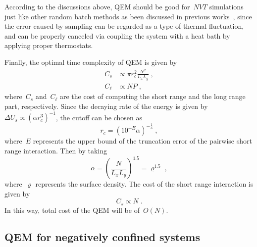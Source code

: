 According to the discussions above, QEM should be good for~$NVT$ simulations just like other random batch methods \cite{jin2020random, jin2021random} as been discussed in previous works~\cite{jin2021convergence,li2019stochastic,li2020random}, since the error caused by sampling can be regarded as a type of thermal fluctuation, and can be properly canceled via coupling the system with a heat bath by applying proper thermostats.

Finally, the optimal time complexity of QEM is given by
\begin{align}
    C_s & \propto \pi r_c^2 \frac{N^2}{L_x L_y}\;,\\
    C_\ell & \propto N P\;,
\end{align}
where~$C_s$ and~$C_\ell$ are the cost of computing the short range and the long range part, respectively.
Since the decaying rate of the energy is given by~$\Delta U_s \propto (\alpha r_c^3)^{-1}$, the cutoff can be chosen as
\begin{equation}
    r_c = (10^{-E} \alpha)^{-\frac{1}{3}}\;,
\end{equation}
where~$E$ represents the upper bound of the truncation error of the pairwise short range interaction.
Then by taking
\begin{equation}\label{eq:alphs-select}
    \alpha = \left(\frac{N}{L_x L_y} \right)^{1.5} = {\varrho}^{1.5}\;,
\end{equation}
where~$\varrho$ represents the surface density.
The cost of the short range interaction is given by
\begin{equation}
    C_s \propto  N\;.
\end{equation}
In this way, total cost of the QEM will be of~$O(N)$.


\subsection{QEM for negatively confined systems}

